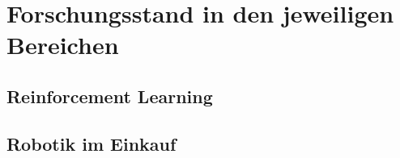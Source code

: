\newpage
\section{Forschungsstand in den jeweiligen Bereichen}
\label{forschung}
\subsection{Reinforcement Learning}
\subsection{Robotik im Einkauf}